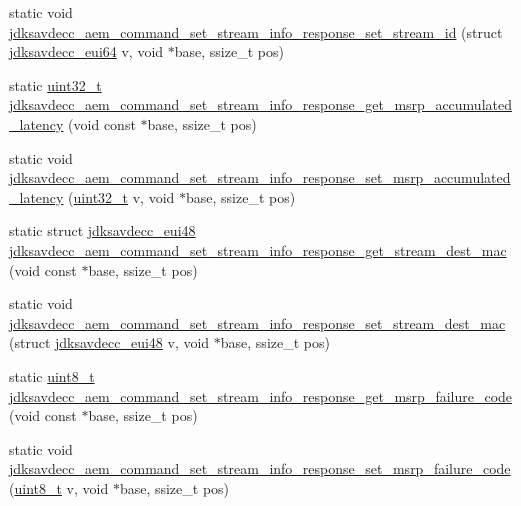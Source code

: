 \begin{DoxyCompactItemize}
\item 
static void \hyperlink{group__command__set__stream__info__response_gafddb263e60e82aafa1e4082d67c342d9}{jdksavdecc\+\_\+aem\+\_\+command\+\_\+set\+\_\+stream\+\_\+info\+\_\+response\+\_\+set\+\_\+stream\+\_\+id} (struct \hyperlink{structjdksavdecc__eui64}{jdksavdecc\+\_\+eui64} v, void $\ast$base, ssize\+\_\+t pos)
\item 
static \hyperlink{parse_8c_a6eb1e68cc391dd753bc8ce896dbb8315}{uint32\+\_\+t} \hyperlink{group__command__set__stream__info__response_gabb817d587079040fde1cdaf0e22bf7dd}{jdksavdecc\+\_\+aem\+\_\+command\+\_\+set\+\_\+stream\+\_\+info\+\_\+response\+\_\+get\+\_\+msrp\+\_\+accumulated\+\_\+latency} (void const $\ast$base, ssize\+\_\+t pos)
\item 
static void \hyperlink{group__command__set__stream__info__response_gaee7fb46512887a64189a4f01113978d2}{jdksavdecc\+\_\+aem\+\_\+command\+\_\+set\+\_\+stream\+\_\+info\+\_\+response\+\_\+set\+\_\+msrp\+\_\+accumulated\+\_\+latency} (\hyperlink{parse_8c_a6eb1e68cc391dd753bc8ce896dbb8315}{uint32\+\_\+t} v, void $\ast$base, ssize\+\_\+t pos)
\item 
static struct \hyperlink{structjdksavdecc__eui48}{jdksavdecc\+\_\+eui48} \hyperlink{group__command__set__stream__info__response_ga2261c2315e02e415e0b56e8161e15aee}{jdksavdecc\+\_\+aem\+\_\+command\+\_\+set\+\_\+stream\+\_\+info\+\_\+response\+\_\+get\+\_\+stream\+\_\+dest\+\_\+mac} (void const $\ast$base, ssize\+\_\+t pos)
\item 
static void \hyperlink{group__command__set__stream__info__response_ga7ad9c17b4d7561792794b94ce49209f0}{jdksavdecc\+\_\+aem\+\_\+command\+\_\+set\+\_\+stream\+\_\+info\+\_\+response\+\_\+set\+\_\+stream\+\_\+dest\+\_\+mac} (struct \hyperlink{structjdksavdecc__eui48}{jdksavdecc\+\_\+eui48} v, void $\ast$base, ssize\+\_\+t pos)
\item 
static \hyperlink{stdint_8h_aba7bc1797add20fe3efdf37ced1182c5}{uint8\+\_\+t} \hyperlink{group__command__set__stream__info__response_ga0e1d7a00d16fc6b22f5e48e2b8f2197a}{jdksavdecc\+\_\+aem\+\_\+command\+\_\+set\+\_\+stream\+\_\+info\+\_\+response\+\_\+get\+\_\+msrp\+\_\+failure\+\_\+code} (void const $\ast$base, ssize\+\_\+t pos)
\item 
static void \hyperlink{group__command__set__stream__info__response_gab1ae640a9595bce4b531c43eb1b9e6b1}{jdksavdecc\+\_\+aem\+\_\+command\+\_\+set\+\_\+stream\+\_\+info\+\_\+response\+\_\+set\+\_\+msrp\+\_\+failure\+\_\+code} (\hyperlink{stdint_8h_aba7bc1797add20fe3efdf37ced1182c5}{uint8\+\_\+t} v, void $\ast$base, ssize\+\_\+t pos)

\end{DoxyCompactItemize}
